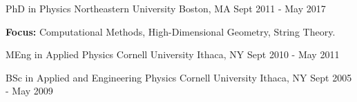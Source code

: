 

\begin{cventries}

  \cventry
    {PhD in Physics} %
    {Northeastern University} %
    {Boston, MA} %
    {Sept 2011 - May 2017} %
    {
      \begin{cvitems} %
        \item {\textbf{Focus:} Computational Methods, High-Dimensional Geometry, String Theory.}
      \end{cvitems}
    }

  \cventry
    {MEng in Applied Physics} %
    {Cornell University} %
    {Ithaca, NY} %
    {Sept 2010 - May 2011} %
    {
    }

  \cventry
    {BSc in Applied and Engineering Physics} %
    {Cornell University} %
    {Ithaca, NY} %
    {Sept 2005 - May 2009} %
    {
    }
\end{cventries}
